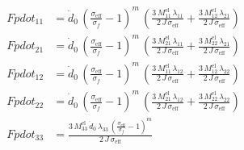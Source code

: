 \begin{align}
Fpdot_{11} &= \dot{d}_{0}\,{\left(\frac{\sigma _{\mathrm{eff}}}{\sigma _{f}}-1\right)}^m\,\left(\frac{3\,M_{11}^{\mathrm{el}}\,\lambda _{11}}{2\,J\,\sigma _{\mathrm{eff}}}+\frac{3\,M_{12}^{\mathrm{el}}\,\lambda _{21}}{2\,J\,\sigma _{\mathrm{eff}}}\right) \\ 
Fpdot_{21} &= \dot{d}_{0}\,{\left(\frac{\sigma _{\mathrm{eff}}}{\sigma _{f}}-1\right)}^m\,\left(\frac{3\,M_{21}^{\mathrm{el}}\,\lambda _{11}}{2\,J\,\sigma _{\mathrm{eff}}}+\frac{3\,M_{22}^{\mathrm{el}}\,\lambda _{21}}{2\,J\,\sigma _{\mathrm{eff}}}\right) \\ 
Fpdot_{12} &= \dot{d}_{0}\,{\left(\frac{\sigma _{\mathrm{eff}}}{\sigma _{f}}-1\right)}^m\,\left(\frac{3\,M_{11}^{\mathrm{el}}\,\lambda _{12}}{2\,J\,\sigma _{\mathrm{eff}}}+\frac{3\,M_{12}^{\mathrm{el}}\,\lambda _{22}}{2\,J\,\sigma _{\mathrm{eff}}}\right) \\ 
Fpdot_{22} &= \dot{d}_{0}\,{\left(\frac{\sigma _{\mathrm{eff}}}{\sigma _{f}}-1\right)}^m\,\left(\frac{3\,M_{21}^{\mathrm{el}}\,\lambda _{12}}{2\,J\,\sigma _{\mathrm{eff}}}+\frac{3\,M_{22}^{\mathrm{el}}\,\lambda _{22}}{2\,J\,\sigma _{\mathrm{eff}}}\right) \\ 
Fpdot_{33} &= \frac{3\,M_{33}^{\mathrm{el}}\,\dot{d}_{0}\,\lambda _{33}\,{\left(\frac{\sigma _{\mathrm{eff}}}{\sigma _{f}}-1\right)}^m}{2\,J\,\sigma _{\mathrm{eff}}} 
\end{align}
